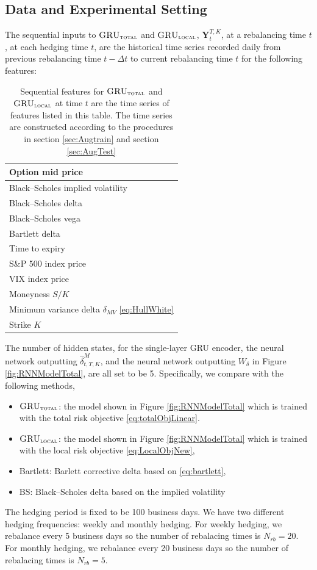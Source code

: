 \documentclass[letterpaper,12pt,titlepage,oneside,final]{book}
\numberwithin{equation}{section}
\theoremstyle{definition}
\newcommand{\modelT}{\textsc{GRU}_{\textsc{total}}}
\newcommand{\modelL}{\textsc{GRU}_{\textsc{local}}}
\newcommand{\DT}{\Delta t}
\begin{document}
\subsection{Data and Experimental Setting}
The sequential inputs to $\modelT$ and $\modelL$, $\mathbf{Y}_{t}^{T,K}$, at a rebalancing time $t$, at each hedging time $t$, are the historical time series recorded daily from previous rebalancing time $t-\DT$ to current rebalancing time $t$ for the following features:


\begin{table}[htp!]
	\centering
	\begin{tabular}{|l|}
		\hline
		Option mid price\\ \hline
		Black–Scholes implied volatility\\
		\hline
		Black–Scholes delta\\
		\hline
		Black–Scholes vega \\
		\hline
		Bartlett delta \\
		\hline
		Time to expiry \\\hline
		S\&P 500 index price\\\hline
		VIX index price\\\hline
		Moneyness $S/K$\\\hline
		Minimum variance delta $\delta_{MV}$  \eqref{eq:HullWhite}\\\hline
		Strike $K$ \\   \hline
	\end{tabular}
	\caption{Sequential features for $\modelT$ and $\modelL$ at time $t$ are the  time series of features listed in this table. The time series are constructed according to the procedures in section \ref{sec:Augtrain} and section \ref{sec:AugTest}}
\end{table}

The number of hidden states, for the single-layer GRU encoder, the neural network outputting $\widehat{\delta}^M_{t,T,K}$, and the neural network outputting $W_{\delta}$  in Figure \ref{fig:RNNModelTotal}, are all set to be 5.  Specifically, we compare with the following methods,
\begin{itemize}
	\item $\modelT$: the model shown in Figure \ref{fig:RNNModelTotal} which is trained with the total risk objective \eqref{eq:totalObjLinear}.
	\item $\modelL$: the model shown in Figure \ref{fig:RNNModelTotal} which is trained with the local risk objective \eqref{eq:LocalObjNew},
	\item Bartlett: Barlett corrective  delta based on \eqref{eq:bartlett},
	\item BS: Black–Scholes delta based on the implied volatility 
\end{itemize}
The hedging period is fixed to be 100 business days. We have two different hedging frequencies: weekly and monthly hedging. For weekly hedging, we rebalance every 5 business days so the number of rebalacing times is $N_{rb}=20$. For monthly hedging, we rebalance every 20 business days so the number of rebalacing times is $N_{rb}=5$.
\end{document}
